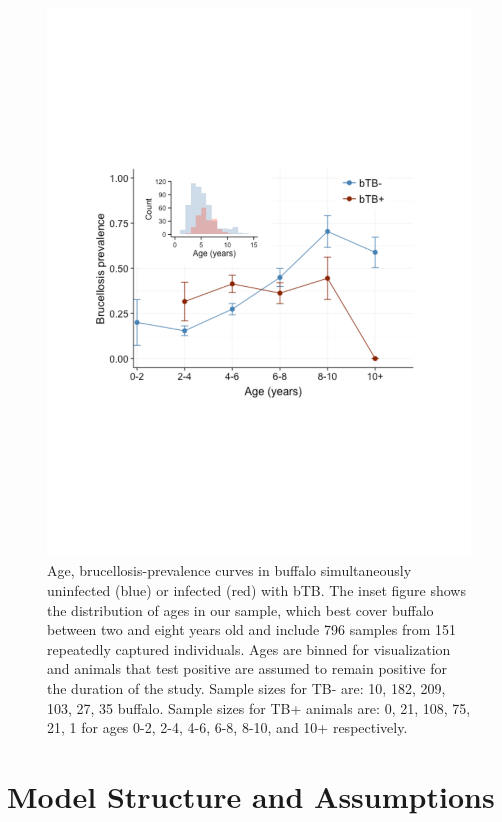 \documentclass[letterpaper,12pt]{article}
\begin{document}
\begin{figure}
\begin{center}
\includegraphics[width=5in]{Figure1_ageprev}
\end{center}
\caption{Age, brucellosis-prevalence curves in buffalo simultaneously uninfected (blue) or infected (red) with bTB.  The inset figure shows the distribution of ages in our sample, which best cover buffalo between two and eight years old and include 796 samples from 151 repeatedly captured individuals.  Ages are binned for visualization and animals that test positive are assumed to remain positive for the duration of the study.  Sample sizes for TB- are: 10, 182, 209, 103, 27, 35 buffalo.  Sample sizes for TB+ animals are: 0, 21, 108, 75, 21, 1 for ages 0-2, 2-4, 4-6, 6-8, 8-10, and 10+ respectively.}
\label{fig1}
\end{figure}



\pagebreak
\section*{Model Structure and Assumptions}
\end{document}
